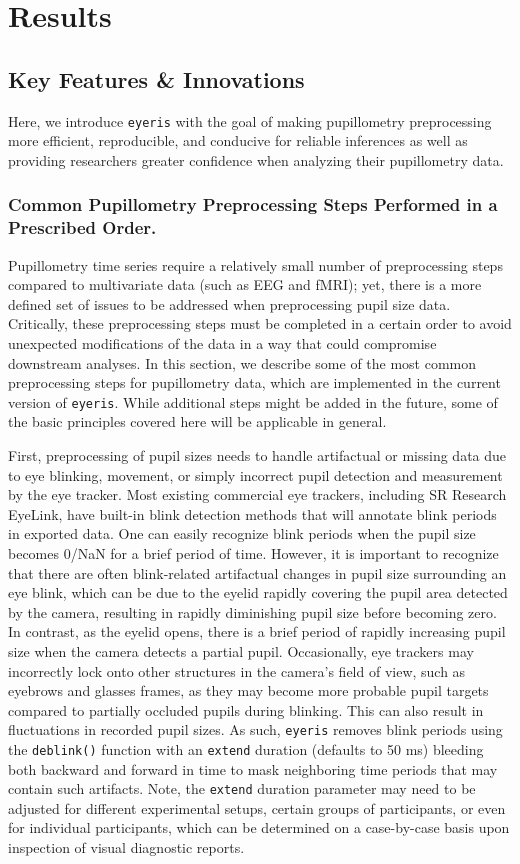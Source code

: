 \section{Results}
\subsection{Key Features \& Innovations}
Here, we introduce \texttt{eyeris} with the goal of making pupillometry preprocessing more efficient, reproducible, and conducive for reliable inferences as well as providing researchers greater confidence when analyzing their pupillometry data.

\subsubsection{Common Pupillometry Preprocessing Steps Performed in a Prescribed Order.}\label{sec:preproc-steps}
Pupillometry time series require a relatively small number of preprocessing steps compared to multivariate data (such as EEG and fMRI); yet, there is a more defined set of issues to be addressed when preprocessing pupil size data. Critically, these preprocessing steps must be completed in a certain order to avoid unexpected modifications of the data in a way that could compromise downstream analyses. In this section, we describe some of the most common preprocessing steps for pupillometry data, which are implemented in the current version of \texttt{eyeris}. While additional steps might be added in the future, some of the basic principles covered here will be applicable in general.

First, preprocessing of pupil sizes needs to handle artifactual or missing data due to eye blinking, movement, or simply incorrect pupil detection and measurement by the eye tracker. Most existing commercial eye trackers, including SR Research EyeLink, have built-in blink detection methods that will annotate blink periods in exported data. One can easily recognize blink periods when the pupil size becomes 0/NaN for a brief period of time. However, it is important to recognize that there are often blink-related artifactual changes in pupil size surrounding an eye blink, which can be due to the eyelid rapidly covering the pupil area detected by the camera, resulting in rapidly diminishing pupil size before becoming zero. In contrast, as the eyelid opens, there is a brief period of rapidly increasing pupil size when the camera detects a partial pupil. Occasionally, eye trackers may incorrectly lock onto other structures in the camera’s field of view, such as eyebrows and glasses frames, as they may become more probable pupil targets compared to partially occluded pupils during blinking. This can also result in fluctuations in recorded pupil sizes. As such, \texttt{eyeris} removes blink periods using the \texttt{deblink()} function with an \texttt{extend} duration (defaults to 50 ms) bleeding both backward and forward in time to mask neighboring time periods that may contain such artifacts. Note, the \texttt{extend} duration parameter may need to be adjusted for different experimental setups, certain groups of participants, or even for individual participants, which can be determined on a case-by-case basis upon inspection of visual diagnostic reports.

